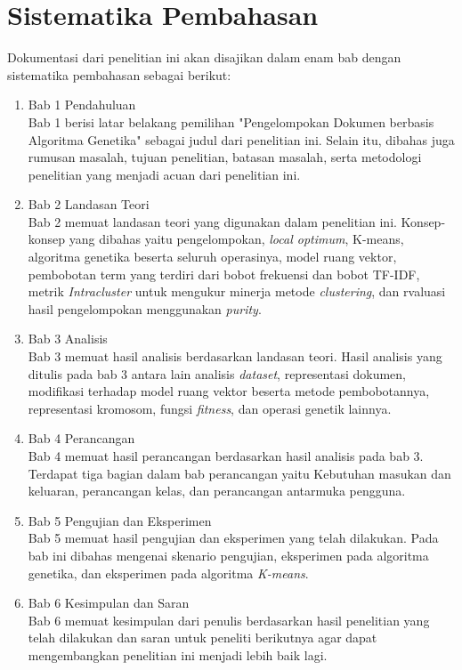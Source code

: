\section{Sistematika Pembahasan}
\label{sec:sispem}
Dokumentasi dari penelitian ini akan disajikan dalam enam bab dengan sistematika pembahasan sebagai berikut:
\begin{enumerate}
	\item Bab 1 Pendahuluan\\
		Bab 1 berisi latar belakang pemilihan "Pengelompokan Dokumen berbasis Algoritma Genetika" sebagai judul dari penelitian ini. Selain itu, dibahas juga rumusan masalah, tujuan penelitian, batasan masalah, serta metodologi penelitian yang menjadi acuan dari penelitian ini.
	\item Bab 2 Landasan Teori\\
		Bab 2 memuat landasan teori yang digunakan dalam penelitian ini. Konsep-konsep yang dibahas yaitu pengelompokan, \textit{local optimum}, K-means, algoritma genetika beserta seluruh operasinya, model ruang vektor, pembobotan term yang terdiri dari bobot frekuensi dan bobot TF-IDF, metrik \textit{Intracluster} untuk mengukur minerja metode \textit{clustering}, dan rvaluasi hasil pengelompokan menggunakan \textit{purity}.
	\item Bab 3 Analisis\\		
		Bab 3 memuat hasil analisis berdasarkan landasan teori. Hasil analisis yang ditulis pada bab 3 antara lain analisis \textit{dataset}, representasi dokumen, modifikasi terhadap model ruang vektor beserta metode pembobotannya, representasi kromosom, fungsi \textit{fitness}, dan operasi genetik lainnya.
	\item Bab 4 Perancangan\\
		Bab 4 memuat hasil perancangan berdasarkan hasil analisis pada bab 3. Terdapat tiga bagian dalam bab perancangan yaitu Kebutuhan masukan dan keluaran, perancangan kelas, dan perancangan antarmuka pengguna.
	\item Bab 5 Pengujian dan Eksperimen\\
		Bab 5 memuat hasil pengujian dan eksperimen yang telah dilakukan. Pada bab ini dibahas mengenai skenario pengujian, eksperimen pada algoritma genetika, dan eksperimen pada algoritma \textit{K-means}.
	\item Bab 6 Kesimpulan dan Saran\\
		Bab 6 memuat kesimpulan dari penulis berdasarkan hasil penelitian yang telah dilakukan dan saran untuk peneliti berikutnya agar dapat mengembangkan penelitian ini menjadi lebih baik lagi.
\end{enumerate}